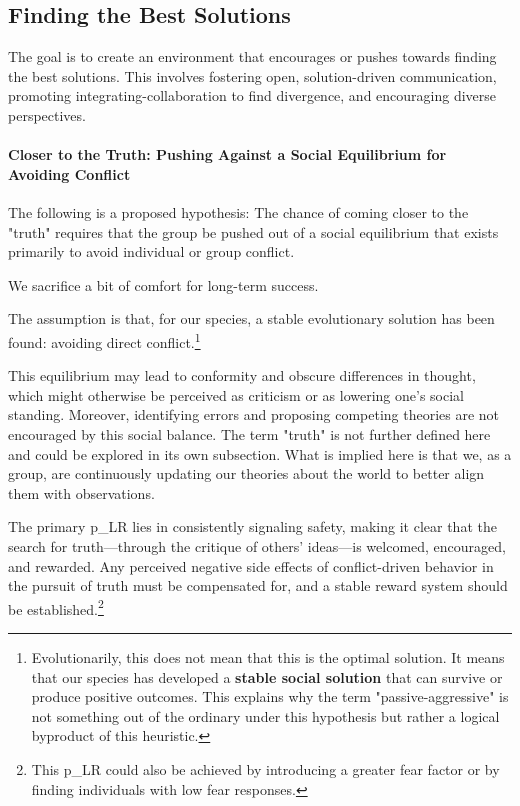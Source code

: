 \subsection{Finding the Best Solutions} \label{responsibility__finding}
The goal is to create an environment that encourages or pushes towards finding the best solutions. This involves fostering open, solution-driven communication, promoting integrating-collaboration to find divergence, and encouraging diverse perspectives.

\paragraph{Closer to the Truth: Pushing Against a Social Equilibrium for Avoiding Conflict}

The following is a proposed hypothesis: The chance of coming closer to the "truth" requires that the group be pushed out of a social equilibrium that exists primarily to avoid individual or group conflict.

\begin{center} We sacrifice a bit of comfort for long-term success. \end{center}

The assumption is that, for our species, a stable evolutionary solution has been found: avoiding direct conflict.\footnote{
	Evolutionarily, this does not mean that this is the optimal solution. It means that our species has developed a \textbf{stable social solution} that can survive or produce positive outcomes. This explains why the term "passive-aggressive" is not something out of the ordinary under this hypothesis but rather a logical byproduct of this heuristic.
}

This equilibrium may lead to conformity and obscure differences in thought, which might otherwise be perceived as criticism or as lowering one's social standing. Moreover, identifying errors and proposing competing theories are not encouraged by this social balance. The term "truth" is not further defined here and could be explored in its own subsection. What is implied here is that we, as a group, are continuously updating our theories about the world to better align them with observations.

The primary \gls{p_LR} lies in consistently signaling safety, making it clear that the search for truth—through the critique of others' ideas—is welcomed, encouraged, and rewarded. Any perceived negative side effects of conflict-driven behavior in the pursuit of truth must be compensated for, and a stable reward system should be established.\footnote{
	This \gls{p_LR} could also be achieved by introducing a greater fear factor or by finding individuals with low fear responses.
}

